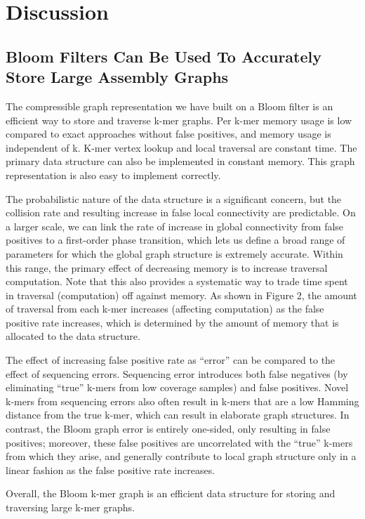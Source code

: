 \documentclass[12pt]{article} \usepackage{simplemargins}
\begin{document}
\section{Discussion}

\subsection{Bloom Filters Can Be Used To Accurately Store Large Assembly Graphs}
The compressible graph representation we have built on a Bloom filter
is an efficient way to store and traverse k-mer graphs.  Per k-mer
memory usage is low compared to exact approaches without false positives,
and memory usage is independent of k.  K-mer vertex lookup and
local traversal are constant time.  The primary data structure can
also be implemented in constant memory.  This graph representation is
also easy to implement correctly.

The probabilistic nature of the data structure is a significant
concern, but the collision rate and resulting increase in false local
connectivity are predictable.  On a larger scale, we can link the
rate of increase in global connectivity from false positives to a
first-order phase transition, which lets us define a broad range of
parameters for which the global graph structure is extremely accurate.
Within this range, the primary effect of decreasing memory is to increase
traversal computation.  Note that this also provides a systematic way
to trade time spent in traversal (computation) off against memory. As shown 
in Figure 2, the amount of traversal from each k-mer increases 
(affecting computation) as the false positive rate increases, which 
is determined by the amount of memory that is allocated to the data 
structure.

The effect of increasing false positive rate as ``error'' can be
compared to the effect of sequencing errors.  Sequencing error
introduces both false negatives (by eliminating ``true'' k-mers from
low coverage samples) and false positives.  Novel k-mers
from sequencing errors also often result in k-mers that are
a low Hamming distance from the true k-mer, which can result in
elaborate graph structures.  In contrast, the Bloom graph error is
entirely one-sided, only resulting in false positives; moreover, these
false positives are uncorrelated with the ``true'' k-mers from which
they arise, and generally contribute to local graph structure only 
in a linear fashion as the false positive rate increases.

Overall, the Bloom k-mer graph is an efficient data structure for
storing and traversing large k-mer graphs.
\end{document}
